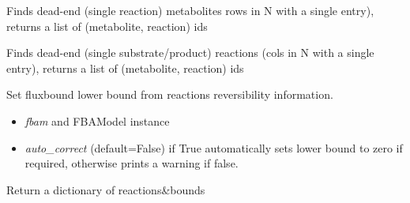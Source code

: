 \documentclass[a4paper,11pt,english]{sphinxmanual}
\begin{document}

\begin{fulllineitems}
\label{modules_doc:cbmpy.CBTools.findDeadEndMetabolites}
Finds dead-end (single reaction) metabolites rows in N with a single entry), returns a list of (metabolite, reaction) ids

\end{fulllineitems}


\begin{fulllineitems}
\label{modules_doc:cbmpy.CBTools.findDeadEndReactions}
Finds dead-end (single substrate/product) reactions (cols in N with a single entry), returns a list of (metabolite, reaction) ids

\end{fulllineitems}


\begin{fulllineitems}
\label{modules_doc:cbmpy.CBTools.fixReversibility}
Set fluxbound lower bound from reactions reversibility information.
\begin{itemize}
\item {} 
\emph{fbam} and FBAModel instance

\item {} 
\emph{auto\_correct} (default=False) if True automatically sets lower bound to zero if required, otherwise prints a warning if false.

\end{itemize}

\end{fulllineitems}


\begin{fulllineitems}
\label{modules_doc:cbmpy.CBTools.getBoundsDict}
Return a dictionary of reactions\&bounds

\end{fulllineitems}
\end{document}
